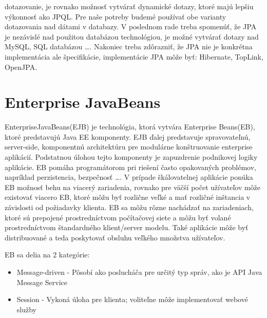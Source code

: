 dotazovanie, je rovnako možnosť vytvárať dynamické dotazy, ktoré majú lepšiu výkonnosť ako JPQL. Pre naše potreby budemé používať obe varianty dotazovania nad dátami v databazy. V poslednom rade treba spomenúť, že JPA je nezávislé nad použitou databázou technológiou, je možné vytvárať dotazy nad MySQL, SQL databázou \ldots. Nakoniec treba zdôrazniť, že JPA nie je konkrétna implementácia ale špecifikácie, implementácie JPA môže byť: Hibernate, TopLink, OpenJPA.


\section{Enterprise JavaBeans}
EnterpriseJavaBeans(EJB) je technológia, ktorá vytvára Enterprise Beans(EB), ktoré predstavujú Java EE komponenty. EJB ďalej predstavuje spravovateľnú, server-side, komponentnú architektúru pre modulárne konštruovanie enterprise aplikácií. Podstatnou úlohou tejto komponenty je zapuzdrenie podnikovej logiky aplikácie. EB pomáha programátorom pri riešení často opakovaných problémov, napríklad perzistencia, bezpečnosť \ldots. V prípade škálovatelnej aplikácie ponúka EB možnosť behu na viacerý zariadenia, rovnako pre väčší počet užívateľov môže existovať viacero EB, ktoré môžu byť rozlične veľké a mať rozličné inštancia v závislosti od požiadavky klienta. EB sa môžu rôzne nachádzať na zariadeniach, ktoré sú prepojené prostredníctvom počítačovej siete a môžu byť volané prostredníctvom štandardného klient/server modelu. Také aplikácie môže byť distribuované a teda poskytovať obsluhu veľkého množstva užívateľov.


EB sa delia na 2 kategórie:
\begin{itemize}
\item Message-driven -  Pôsobí ako poslucháča pre určitý typ správ, ako je API Java Message Service
\item Session - Vykoná úloha pre klienta; voliteľne môže implementovať webové služby

\end{itemize}


